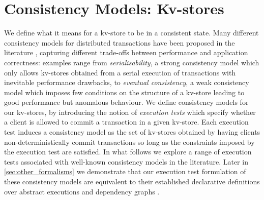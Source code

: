 \section{Consistency Models: Kv-stores}
\label{sec:cm}
We define what it means for a kv-store 
to be in a consistent state. Many different consistency models for
distributed transactions have 
been proposed in the literature
\cite{principle-eventual-consistency,rola,cops,redblue,PSI,clocksi},
capturing different trade-offs 
between  performance and application
correctness: examples range from  \emph{serialisability}, a strong
consistency model which only allows kv-stores 
obtained  from a serial execution of transactions
with inevitable performance drawbacks, to  \emph{eventual consistency},  a weak consistency model
which imposes few conditions on the structure of a kv-store leading to
good performance but anomalous behaviour.
We define consistency models for our kv-stores,
by introducing the notion of 
\emph{execution tests} which specify whether a client is allowed to commit a transaction in a given 
kv-store. Each execution test induces a consistency model as the set of kv-stores obtained 
by having clients non-deterministically commit transactions so long as  the constraints 
imposed by the execution test are satisfied.
In what follows we explore a range of execution tests  associated with well-known consistency models in the literature. 
Later in \cref{sec:other_formalisms} we demonstrate that our execution test formulation of these consistency models are  equivalent to their established declarative definitions over abstract executions \cite{framework-concur} and dependency graphs \cite{adya}.


%
%
%





%
%

